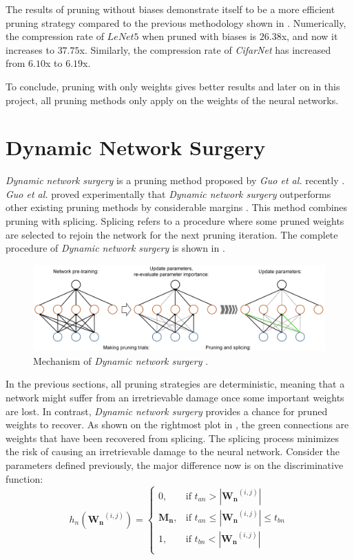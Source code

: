 \documentclass[a4paper,12pt]{report}
\begin{document}
The results of pruning without biases demonstrate itself to be a more efficient pruning
strategy compared to the previous methodology shown in .
Numerically, the compression rate of $LeNet5$ when pruned with biases is $26.38$x,
and now it increases to $37.75$x.
Similarly, the compression rate of \textit{CifarNet} has increased from $6.10$x
to $6.19$x.

To conclude, pruning with only weights gives better results and later on in this
project, all pruning methods only apply on the weights of the neural
networks.

\section{Dynamic Network Surgery}
\textit{Dynamic network surgery} is a pruning method proposed by \textit{Guo et
al.} recently \cite{Guo}.
\textit{Guo et al.} proved experimentally that \textit{Dynamic network surgery}
outperforms other existing pruning methods by considerable margins \cite{Guo}.
This method combines pruning with splicing.
Splicing refers to a procedure where some pruned weights are selected to
rejoin the network for the next pruning iteration.
The complete procedure of \textit{Dynamic network surgery} is shown in
.

\begin{figure}[!h]
  \includegraphics[width=\textwidth]{fig_dns.png}
  \caption{Mechanism of \textit{Dynamic network surgery} \cite{Guo}.}
  \label{fig:dynamic_network_surgery}
\end{figure}

In the previous sections, all pruning strategies are deterministic,
meaning that a network might suffer from an irretrievable damage once some
important weights are lost.
In contrast, \textit{Dynamic network surgery} provides a chance for pruned weights to
recover.
As shown on the rightmost plot in , the green
connections are weights that have been recovered from splicing.
The splicing process minimizes the risk of causing an irretrievable damage to the
neural network.
Consider the parameters defined previously, the major difference now is on
the discriminative function:
\begin{equation}
  h_n(\mathbf{W_n}^{(i,j)}) =
  \begin{cases}
    0, &\text{if } t_{an} > |\mathbf{W_n}^{(i,j)}| \\
    \mathbf{M_n}, &\text{if } t_{an} \leq |\mathbf{W_n}^{(i,j)}| \leq t_{bn}\\
    1, &\text{if } t_{bn} < |\mathbf{W_n}^{(i,j)}| \\
  \end{cases}
  \label{equ:hfunc_ds}
\end{equation}
\end{document}
